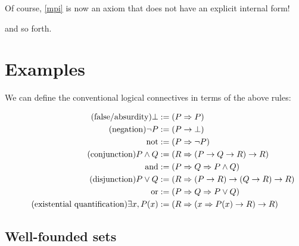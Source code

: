 \documentclass{article}
\begin{document}
  Of course, \eqref{mpi} is now an axiom that does not have an explicit internal form!


  and so forth.

  \section{Examples}\label{structure}

  We can define the conventional logical connectives in terms of the above rules:

  \setlength{\jot}{0.4em}
  \begin{align*}
    \tag{false/absurdity}
    \bot &:= (P \Rightarrow{P})\\
    \tag{negation}
    \neg P &:= ({P \rightarrow \bot})\\
    \mathrm{not} &:= (P \Rightarrow \neg P)\\
    \tag{conjunction}
    P \land Q &:= (R \Rightarrow (P \rightarrow Q \rightarrow R) \rightarrow R)\\
    \mathrm{and} &:= (P \Rightarrow Q \Rightarrow P \land Q)\\
    \tag{disjunction}
    P \lor Q &:= (R \Rightarrow (P \rightarrow R) \rightarrow (Q \rightarrow R) \rightarrow R)\\
    \mathrm{or} &:= (P \Rightarrow Q \Rightarrow P \lor Q)\\
    \tag{existential quantification}
    \exists x, P(x) &:= (R \Rightarrow (x \Rightarrow P(x) \rightarrow R) \rightarrow R)\\
  \end{align*}


  \subsection{Well-founded sets}
\end{document}
